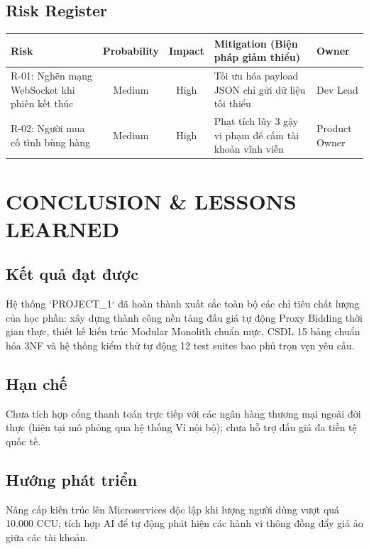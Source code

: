\documentclass[11pt,a4paper]{article}
\begin{document}
\subsection{Risk Register}
\begin{table}[H]
    \centering
    \small
    \begin{tabularx}{\textwidth}{|l|c|c|X|l|}
        \hline
        \textbf{Risk} & \textbf{Probability} & \textbf{Impact} & \textbf{Mitigation (Biện pháp giảm thiểu)} & \textbf{Owner} \\ \hline
        R-01: Nghẽn mạng WebSocket khi phiên kết thúc & Medium & High & Tối ưu hóa payload JSON chỉ gửi dữ liệu tối thiểu & Dev Lead \\ \hline
        R-02: Người mua cố tình bùng hàng & Medium & High & Phạt tích lũy 3 gậy vi phạm để cấm tài khoản vĩnh viễn & Product Owner \\ \hline
    \end{tabularx}
\end{table}

\section{CONCLUSION \& LESSONS LEARNED}

\subsection{Kết quả đạt được}
Hệ thống `PROJECT_1` đã hoàn thành xuất sắc toàn bộ các chỉ tiêu chất lượng của học phần: xây dựng thành công nền tảng đấu giá tự động Proxy Bidding thời gian thực, thiết kế kiến trúc Modular Monolith chuẩn mực, CSDL 15 bảng chuẩn hóa 3NF và hệ thống kiểm thử tự động 12 test suites bao phủ trọn vẹn yêu cầu.

\subsection{Hạn chế}
Chưa tích hợp cổng thanh toán trực tiếp với các ngân hàng thương mại ngoài đời thực (hiện tại mô phỏng qua hệ thống Ví nội bộ); chưa hỗ trợ đấu giá đa tiền tệ quốc tế.

\subsection{Hướng phát triển}
Nâng cấp kiến trúc lên Microservices độc lập khi lượng người dùng vượt quá 10.000 CCU; tích hợp AI để tự động phát hiện các hành vi thông đồng đẩy giá ảo giữa các tài khoản.
\end{document}
